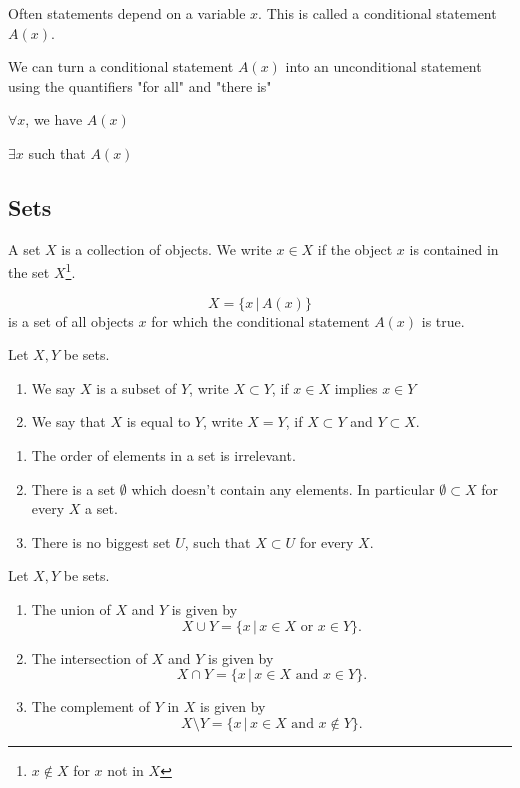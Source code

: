 \documentclass[10pt, a4paper]{article}
\begin{document}
Often statements depend on a variable $x$. This is called a conditional statement $A(x)$.

We can turn a conditional statement $A(x)$ into an unconditional statement using the quantifiers "for all" and "there is"

\begin{example}
    \phantom{}
    
    $\forall x$, we have $A(x)$
    
    $\exists x$ such that $A(x)$
\end{example}


\subsection{Sets}
A set $X$ is a collection of objects. We write $x \in X$ if the object $x$ is contained in the set $X$\footnote{$x \notin X$ for $x$ not in $X$}.

\[
X = \{x\,|\,A(x)\}
\]
is a set of all objects $x$ for which the conditional statement $A(x)$ is true.

\begin{definition}
    Let $X, Y$ be sets.
    \begin{enumerate}[label = (\alph*)]
        \item We say $X$ is a subset of $Y$, write $X \subset Y$, if $x \in X$ implies $x \in Y$
        \item We say that $X$ is equal to $Y$, write $X = Y$, if $X \subset Y$ and $Y \subset X$.
    \end{enumerate}
\end{definition}

\begin{remark}
    \begin{enumerate}[label = (\alph*)]
        \item The order of elements in a set is irrelevant.
        \item There is a set $\emptyset$ which doesn't contain any elements. In particular $\emptyset \subset X$ for every $X$ a set.
        \item There is no biggest set $U$, such that $X \subset U$ for every $X$.
    \end{enumerate}
\end{remark}

\begin{definition}
    Let $X, Y$ be sets.
    \begin{enumerate}[label = (\alph*)]
        \item The union of $X$ and $Y$ is given by
        \[
        X \cup Y = \{x\, |\, x \in X\text{ or } x \in Y\}.
        \]
        \item The intersection of $X$ and $Y$ is given by
        \[
        X \cap Y = \{x\, |\, x \in X\text{ and } x \in Y\}.
        \]
        \item The complement of $Y$ in $X$ is given by
        \[
        X \setminus Y = \{x\, |\, x \in X \text{ and } x \notin Y\}.
        \]
    \end{enumerate}
\end{definition}
\end{document}
